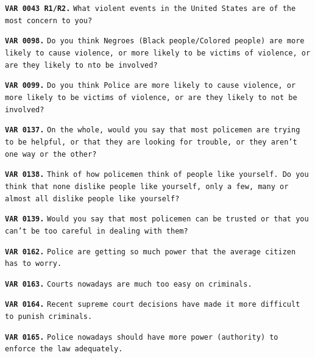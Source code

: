 \documentclass[12pt]{article}
\newenvironment{shift}{\begin{adjustwidth}{1cm}{}}{\end{adjustwidth}}
\begin{document}
	 \vspace{.1in}
	 \begin{shift} \scriptsize
		 \vspace{.01in}
		 \texttt{\textbf{VAR 0043 R1/R2.}} \texttt{What violent events in the United States are of the most concern to you? }


		 \vspace{.01in}
 		\texttt{\textbf{VAR 0098.}}	\texttt{Do you think Negroes (Black people/Colored people) are more likely to cause violence, or more likely to be victims of violence, or are they likely to nto be involved?}


 		\vspace{.01in}
 		\texttt{\textbf{VAR 0099.}}	\texttt{Do you think Police are more likely to cause violence, or more likely to be victims of violence, or are they likely to not be involved?}

 		\vspace{.01in}
 		\texttt{\textbf{VAR 0137.}}	\texttt{On the whole, would you say that most policemen are trying to be helpful, or that they are looking for trouble, or they aren't one way or the other?}

 		\vspace{.01in}
 		\texttt{\textbf{VAR 0138.}}	\texttt{Think of how policemen think of people like yourself.  Do you think that none dislike people like yourself, only a few, many or almost all dislike people like yourself?}

 		\vspace{.01in}
 		\texttt{\textbf{VAR 0139.}}	\texttt{Would you say that most policemen can be trusted or that you can't be too careful in dealing with them?}

		\vspace{.01in}
 		\texttt{\textbf{VAR 0162.}}	\texttt{Police are getting so much power that the average citizen has to worry.}


		\vspace{.01in}
 		\texttt{\textbf{VAR 0163.}}	\texttt{Courts nowadays are much too easy on criminals.}

		\vspace{.01in}
 		\texttt{\textbf{VAR 0164.}}	\texttt{Recent supreme court decisions have made it more difficult to punish criminals.}


		\vspace{.01in}
		\texttt{\textbf{VAR 0165.}}	\texttt{Police nowadays should have more power (authority) to enforce the law adequately.}


\end{shift}
\end{document}
